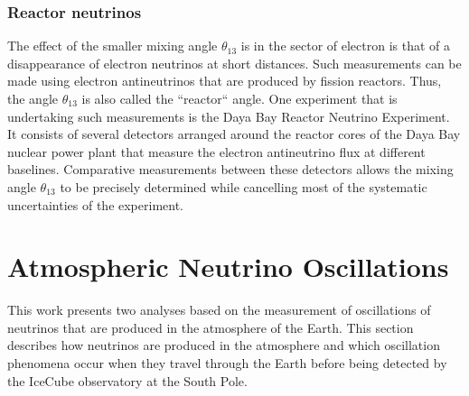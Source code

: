 \subsubsection{Reactor neutrinos}
The effect of the smaller mixing angle $\theta_{13}$ is in the sector of electron is that of a disappearance of electron neutrinos at short distances. Such measurements can be made using electron antineutrinos that are produced by fission reactors. Thus, the angle $\theta_{13}$ is also called the ``reactor`` angle. One experiment that is undertaking such measurements is the Daya Bay Reactor Neutrino Experiment\cite{DayaBay:2007fgu}. It consists of several detectors arranged around the reactor cores of the Daya Bay nuclear power plant that measure the electron antineutrino flux at different baselines. Comparative measurements between these detectors allows the mixing angle $\theta_{13}$ to be precisely determined while cancelling most of the systematic uncertainties of the experiment.


\section{Atmospheric Neutrino Oscillations}
This work presents two analyses based on the measurement of oscillations of neutrinos that are produced in the atmosphere of the Earth. This section describes how neutrinos are produced in the atmosphere and which oscillation phenomena occur when they travel through the Earth before being detected by the IceCube observatory at the South Pole.

